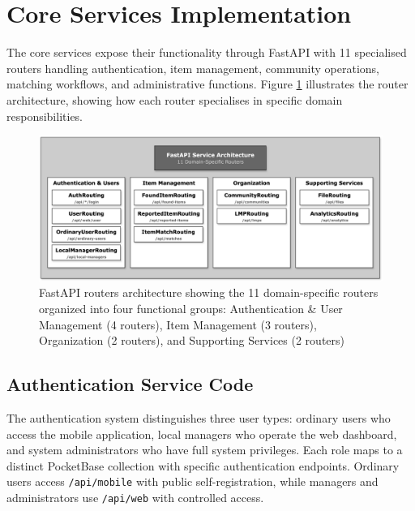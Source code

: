 
\section{Core Services Implementation} \label{section:core_services}

The core services expose their functionality through FastAPI with 11 specialised routers handling authentication, item management, community operations, matching workflows, and administrative functions. Figure \ref{fig:fastapi_routers} illustrates the router architecture, showing how each router specialises in specific domain responsibilities.

\begin{figure}[htbp]
    \centering
    \includegraphics[width=\textwidth]{figs/chapter4/fastapi_routers.png}
    \caption{FastAPI routers architecture showing the 11 domain-specific routers organized into four functional groups: Authentication \& User Management (4 routers), Item Management (3 routers), Organization (2 routers), and Supporting Services (2 routers)}
    \label{fig:fastapi_routers}
\end{figure}

\subsection{Authentication Service Code} \label{subsection:auth_service}

The authentication system distinguishes three user types: ordinary users who access the mobile application, local managers who operate the web dashboard, and system administrators who have full system privileges. Each role maps to a distinct PocketBase collection with specific authentication endpoints. Ordinary users access \texttt{/api/mobile} with public self-registration, while managers and administrators use \texttt{/api/web} with controlled access.

